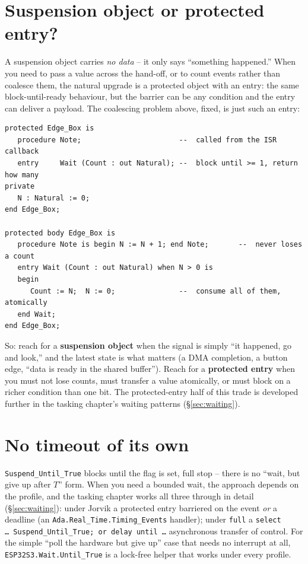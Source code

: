 \section{Suspension object or protected entry?}

A suspension object carries \emph{no data} -- it only says ``something happened.''
When you need to pass a value across the hand-off, or to count events rather than
coalesce them, the natural upgrade is a protected object with an entry: the same
block-until-ready behaviour, but the barrier can be any condition and the entry can
deliver a payload. The coalescing problem above, fixed, is just such an entry:

\begin{lstlisting}
protected Edge_Box is
   procedure Note;                       --  called from the ISR callback
   entry     Wait (Count : out Natural); --  block until >= 1, return how many
private
   N : Natural := 0;
end Edge_Box;

protected body Edge_Box is
   procedure Note is begin N := N + 1; end Note;       --  never loses a count
   entry Wait (Count : out Natural) when N > 0 is
   begin
      Count := N;  N := 0;               --  consume all of them, atomically
   end Wait;
end Edge_Box;
\end{lstlisting}

So: reach for a \textbf{suspension object} when the signal is simply ``it happened,
go and look,'' and the latest state is what matters (a DMA completion, a button
edge, ``data is ready in the shared buffer''). Reach for a \textbf{protected entry}
when you must not lose counts, must transfer a value atomically, or must block on a
richer condition than one bit. The protected-entry half of this trade is developed
further in the tasking chapter's waiting patterns (\S\ref{sec:waiting}).

\section{No timeout of its own}

\texttt{Suspend\_Until\_True} blocks until the flag is set, full stop -- there is no
``wait, but give up after $T$'' form. When you need a bounded wait, the approach
depends on the profile, and the tasking chapter works all three through in detail
(\S\ref{sec:waiting}): under Jorvik a protected entry barriered on the event
\emph{or} a deadline (an \texttt{Ada.Real\_Time.Timing\_Events} handler); under
\texttt{full} a \texttt{select \ldots\ Suspend\_Until\_True; or delay until \ldots}
asynchronous transfer of control. For the simple ``poll the hardware but give up''
case that needs no interrupt at all, \texttt{ESP32S3.Wait.Until\_True} is a
lock-free helper that works under every profile.


